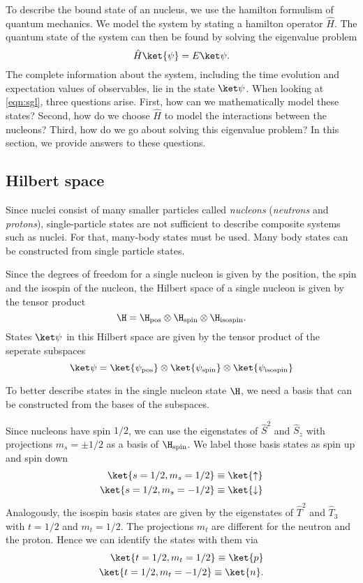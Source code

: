 To describe the bound state of an nucleus, we use the hamilton formulism of quantum mechanics. We model the system by stating a hamilton operator $\hat{H}$. The quantum state of the system can then be found by solving the eigenvalue problem
\begin{equation}
  \label{eqn:sgl}
  \hat{H}\ket{\psi} = E\ket\psi.
\end{equation}
The complete information about the system, including the time evolution and expectation values of observables, lie in the state $\ket\psi$. When looking at \eqref{eqn:sgl}, three questions arise. First, how can we mathematically model these states? Second, how do we choose $\hat{H}$ to model the interactions between the nucleons? Third, how do we go about solving this eigenvalue problem? In this section, we provide answers to these questions.
\subsection{Hilbert space}
Since nuclei consist of many smaller particles called \textit{nucleons} (\textit{neutrons} and \textit{protons}), single-particle states are not sufficient to describe composite systems such as nuclei. For that, many-body states must be used. Many body states can be constructed from single particle states.

Since the degrees of freedom for a single nucleon is given by the position, the spin and the isospin of the nucleon, the Hilbert space of a single nucleon is given by the tensor product
\begin{equation}
  \H = \H_\mathrm{pos} \otimes \H_\mathrm{spin} \otimes \H_\mathrm{isospin}.
\end{equation}
States $\ket\psi$ in this Hilbert space are given by the tensor product of the seperate subspaces
\begin{equation}
  \ket\psi = \ket{\psi_\mathrm{pos}}\otimes \ket{\psi_\mathrm{spin}}\otimes \ket{\psi_\mathrm{isospin}}
\end{equation}

To better describe states in the single nucleon state $\H$, we need a basis that can be constructed from the bases of the subspaces.

Since nucleons have spin $1/2$, we can use the eigenstates of $\hat{S}^2$ and $\hat{S}_z$ with projections $m_s = \pm1/2$ as a basis of $\H_\mathrm{spin}$. We label those basis states as spin up and spin down
\begin{align}
  \ket{s=1/2, m_s =  1/2} \equiv \ket{\uparrow} \\
  \ket{s=1/2, m_s = - 1/2} \equiv \ket{\downarrow}
\end{align}
Analogously, the isospin basis states are given by the eigenstates of $\hat{T}^2$ and $\hat{T}_3$ with $t=1/2$ and $m_t=1/2$. The projections $m_t$ are different for the neutron and the proton. Hence we can identify the states with them via
\begin{align}
  \ket{t=1/2, m_t =  1/2} \equiv \ket{p} \\
  \ket{t=1/2, m_t = - 1/2} \equiv \ket{n}.
\end{align}

